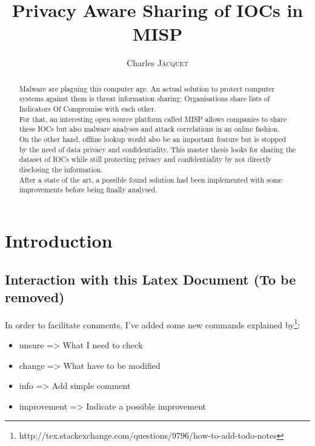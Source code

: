 \documentclass{eplmastersthesis}
\title{Privacy Aware Sharing of IOCs in MISP}	%
\author{Charles \textsc{Jacquet}}	%
\begin{document}
\maketitle					%
\thispagestyle{empty}		%


\begin{abstract} 
Malware are plaguing this computer age. An actual solution to protect computer systems against them is threat information sharing: Organisations share lists of Indicators Of Compromise with each other.\\
For that, an interesting open source platform called MISP allows companies to share these IOCs but also malware analyses and attack correlations in an online fashion.\\
On the other hand, offline lookup would also be an important feature but is stopped by the need of data privacy and confidentiality. This master thesis looks for sharing the dataset of IOCs while still protecting privacy and confidentiality by not directly disclosing the information. \\
After a state of the art, a possible found solution had been implemented with  some improvements before being finally analysed.
\end{abstract}

\tableofcontents

\chapter{Introduction}
\section{Interaction with this Latex Document (To be removed)}
In order to facilitate comments, I've added some new commands explained by\footnote{http://tex.stackexchange.com/questions/9796/how-to-add-todo-notes}:\\
\begin{itemize}
\item unsure => What I need to check
\item change => What have to be modified
\item info => Add simple comment
\item improvement => Indicate a possible improvement
\end{itemize}
\end{document}
